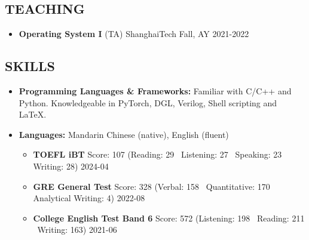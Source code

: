 \documentclass[a4paper,10pt]{ctexart} %
\begin{document}

\begin{keepsection}
\subsection{TEACHING}

    \begin{itemize}
        \item \textbf{Operating System I} (TA) \hfill ShanghaiTech \quad Fall, AY 2021-2022
    \end{itemize}
\end{keepsection}



\begin{keepsection}

\section{SKILLS}
\begin{itemize}
    \item \textbf{Programming Languages \& Frameworks:} Familiar with C/C++ and Python. Knowledgeable in PyTorch, DGL, Verilog, Shell scripting and \LaTeX.
    \item \textbf{Languages:} Mandarin Chinese (native), English (fluent)
        \begin{itemize}
            \item \textbf{TOEFL iBT} \quad Score: 107 {\small (Reading: 29 \, Listening: 27 \, Speaking: 23 \, Writing: 28)} \hfill 2024-04
            \item \textbf{GRE General Test} \quad Score: 328 {\small (Verbal: 158 \, Quantitative: 170 \, Analytical Writing: 4)} \hfill 2022-08
            \item \textbf{College English Test Band 6} \quad Score: 572 {\small (Listening: 198 \, Reading: 211 \, Writing: 163)} \hfill 2021-06
        \end{itemize}
\end{itemize}

\end{keepsection}
\end{document}

